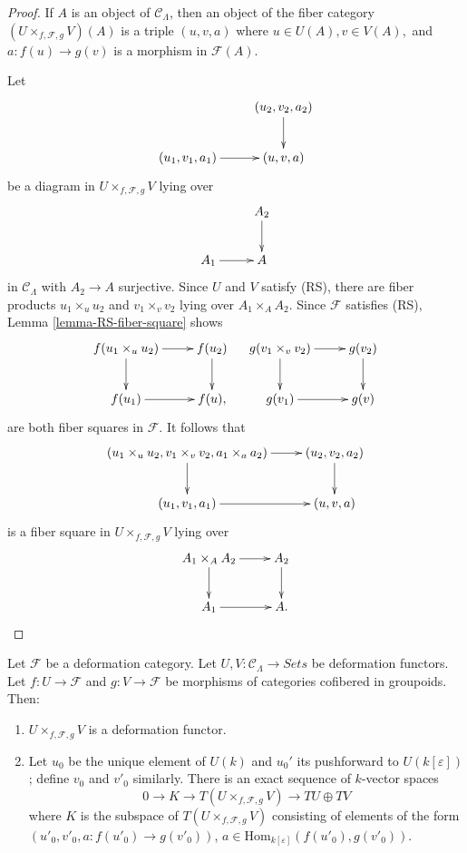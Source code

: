 \begin{proof}
If $A$ is an object of $\mathcal{C}_\Lambda$, then an object of the fiber 
category $(U \times_{f, \mathcal{F}, g} V)(A)$ is a triple $(u,v,a)$ where $u 
\in U(A), v \in V(A),$ and $a: f(u) \to g(v)$ is a morphism in 
$\mathcal{F}(A)$.  

\medskip \noindent 
Let
\[
\xymatrix{
           & (u_2,v_2,a_2) \ar[d] \\
(u_1,v_1,a_1) \ar[r] & (u,v,a)  
}
\]
be a diagram in $U \times_{f, \mathcal{F}, g} V$ lying over
\[
\xymatrix{
           & A_2 \ar[d] \\
A_1 \ar[r] & A   
}
\]  
in $\mathcal{C}_\Lambda$ with $A_2 \to A$ surjective.  Since $U$ and 
$V$ satisfy (RS), there are fiber products $u_1 \times_{u} u_2$ and $v_1 
\times_{v} v_2$ lying over $A_1 \times_{A} A_2$.  Since $\mathcal{F}$ satisfies 
(RS), Lemma \ref{lemma-RS-fiber-square} shows
\[
\xymatrix{
 f(u_1 \times_{u} u_2) \ar[r] \ar[d] & f(u_2) \ar[d] \\
f(u_1) \ar[r] & f(u), 
} \hspace{4 mm} 
\xymatrix{
 g(v_1 \times_{v} v_2) \ar[r] \ar[d] & g(v_2) \ar[d] \\ 
 g(v_1) \ar[r] & g(v)
}
\]
are both fiber squares in $\mathcal{F}$.  It follows that
\[
\xymatrix{
 (u_1 \times_{u} u_2, v_1 \times_{v} v_2, a_{1} \times_{a} a_2) \ar[d] \ar[r] & 
(u_2,v_2,a_2) \ar[d] \\
(u_1,v_1,a_1) \ar[r] & (u,v,a)  
}
\]
is a fiber square in $U \times_{f, \mathcal{F}, g} V$ lying over
\[
\xymatrix{
A_1 \times_{A} A_2  \ar[r] \ar[d]         & A_2 \ar[d] \\
A_1 \ar[r] & A   .
}
\] 
\end{proof}

\begin{lemma}
\label{lemma-deformation-functor-fiber-product-morphisms}
Let $\mathcal{F}$ be a deformation category.  Let $U,V: \mathcal{C}_\Lambda 
\to \textit{Sets}$ be deformation functors.  Let $f: U 
\to \mathcal{F}$ and $g: V \to \mathcal{F}$ be morphisms of 
categories cofibered in groupoids. Then: 
\begin{enumerate}
\item $U \times_{f, \mathcal{F}, g} V$ is a deformation functor.
\item Let $u_0$ be the unique element of $U(k)$ and $u_0'$ its pushforward to 
$U(k[\varepsilon])$; define $v_0$ and $v'_0$ similarly.  There is an exact 
sequence of $k$-vector spaces
\[ 
0 \to K \to T(U \times_{f, \mathcal{F}, g} V) \to TU 
\oplus TV 
\]
where $K$ is the subspace of $T(U \times_{f, \mathcal{F}, g} V)$ consisting of 
elements of the form $(u'_0, v'_0, a: f(u'_0) \to g(v'_0))$, $a \in 
\text{Hom}_{k[\varepsilon]}(f(u'_0), g(v'_0))$.
\end{enumerate}
\end{lemma}

